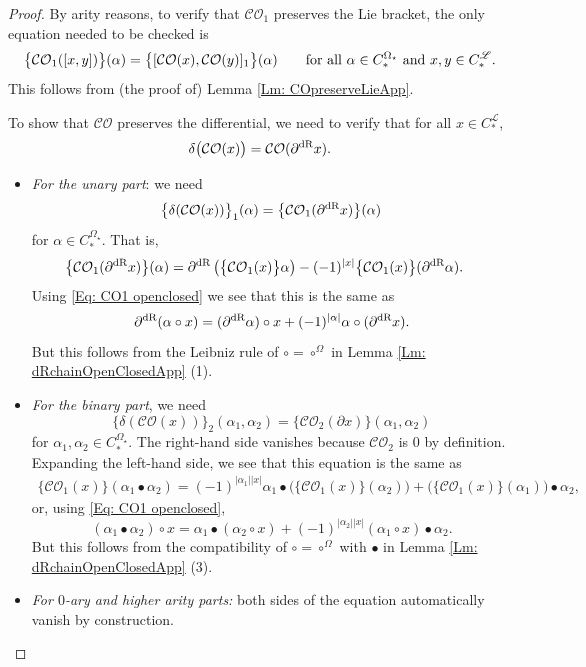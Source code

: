 \documentclass[10pt]{amsart}
\numberwithin{equation}{section}
\theoremstyle{plain}
\theoremstyle{definition}
\theoremstyle{remark}
\numberwithin{equation}{section}
\newcommand{\dR}{\textup{dR}}
\newcommand{\CO}{\mathcal{CO}}
\newcommand{\CFr}{C_*^\mathscr{L}}
\newcommand{\CBa}{C_*^{\Omega_\star}}
\begin{document}
{\begin{proof}
By arity reasons, to verify that $\CO_1$ preserves the Lie bracket, the only equation needed to be checked is
\[   \big\{\CO_1([x,y])\big\}(\alpha) = \big\{[\CO(x),\CO(y)]_1\big\}(\alpha) \quad \quad  \textup{for all }\alpha\in \CBa\textup{ and }x, y\in \CFr.\]
This follows from (the proof of) Lemma \ref{Lm: COpreserveLieApp}.


To show that $\CO$ preserves the differential, we need to verify that for all $x\in \CFr$, 
\[			\delta\big( \CO(x)\big)=\CO(\partial^\dR x).\]

\begin{itemize}
	\item \emph{For the unary part}: we need \[\big\{\delta(\CO(x))\big\}_1(\alpha) = \big\{\CO_1(\partial^\dR x)\big\}(\alpha)\] for $\alpha\in \CBa$.
	That is, 
	\begin{align*}
		  \big\{ \CO_1(\partial^\dR x)\big\} (\alpha)= \partial^\dR &\left( \big\{ \CO_1(x)\big\} \alpha \right) - (-1)^{|x|} \big\{ \CO_1(x)\big\} (\partial^\dR \alpha) .
	\end{align*}	
	Using \eqref{Eq: CO1 openclosed} we see that this is the same as 
	\[
		\partial^\dR(\alpha \circ x) = (\partial^\dR \alpha) \circ x + (-1)^{|\alpha|} \alpha\circ (\partial^\dR x).
	\]
	But this follows from the Leibniz rule of $\circ =\circ^\Omega$ in Lemma \ref{Lm: dRchainOpenClosedApp} (1).
\bigskip
		

	\item \emph{For the binary part}, we need 
	\[\big\{\delta(\CO(x))\big\}_2(\alpha_1,\alpha_2)=\big\{\CO_2(\partial x)\big\}(\alpha_1,\alpha_2) \] for $\alpha_1,\alpha_2\in \CBa$.
		The right-hand side  vanishes because $\CO_2$  is $0$ by definition.
		Expanding the left-hand side, we see that this equation is the same as  \begin{align*}
			\big\{\CO_1(x)\big\} (\alpha_1\bullet\alpha_2)= (-1)^{|\alpha_1||x|} \alpha_1 \bullet \big( \big\{ \CO_1(x)\big\}(\alpha_2) \big) + \big( \big\{ \CO_1(x)\big\} (\alpha_1) \big)\bullet \alpha_2,
		\end{align*}	
		or, using \eqref{Eq: CO1 openclosed}, \[ (\alpha_1\bullet \alpha_2) \circ x = \alpha_1\bullet(\alpha_2\circ x) + (-1)^{|\alpha_2||x|} (\alpha_1\circ x) \bullet \alpha_2. \]
		But this follows from the compatibility of $\circ=\circ^\Omega$ with $\bullet$ in Lemma \ref{Lm: dRchainOpenClosedApp} (3). 

\item \emph{For $0$-ary and higher arity parts:} both sides of the equation automatically vanish by construction.
\end{itemize}
\end{proof}


}
\end{document}
